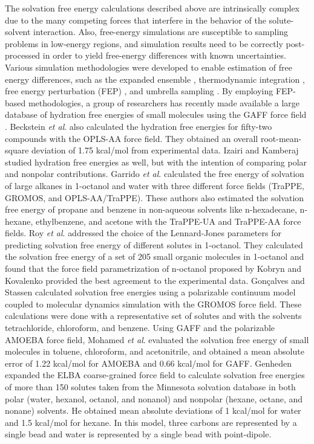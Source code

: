 \documentclass[preprint]{elsarticle}
\begin{document}
	The solvation free energy calculations described above are intrinsically complex due to the many competing forces that interfere in the behavior of the solute-solvent interaction. Also, free-energy simulations are susceptible to sampling problems in low-energy regions, and simulation results need to be correctly post-processed in order to yield free-energy differences with known uncertainties. Various simulation methodologies were developed to enable estimation of free energy differences, such as the expanded ensemble \cite{lyubartsev}, thermodynamic integration \cite{kirkwood1935}, free energy perturbation (FEP) \cite{zwanzig1954,bennet1976,mbar}, and umbrella sampling \cite{TORRIE1977187}. By employing FEP-based methodologies, a group of researchers has recently made available a large database of hydration free energies of small molecules using the GAFF force field \cite{PMID:24928188,mobley2017}. Beckstein \textit{et al}. \cite{Beckstein2014} also calculated the hydration free energies for fifty-two compounds with the OPLS-AA force field. They obtained an overall root-mean-square deviation of 1.75 kcal/mol from experimental data. Izairi and Kamberaj \cite{izairi2017} studied hydration free energies as well, but with the intention of comparing polar and nonpolar contributions. Garrido \textit{et al}. \cite{garrido,garrido2011} calculated the free energy of solvation of large alkanes in 1-octanol and water with three different force fields (TraPPE, GROMOS, and OPLS-AA/TraPPE). These authors also estimated the solvation free energy of propane and benzene in non-aqueous solvents like n-hexadecane, n-hexane, ethylbenzene, and acetone with the TraPPE-UA and TraPPE-AA force fields. Roy \textit{et al}. \cite{roy2017} addressed the choice of the Lennard-Jones parameters for predicting solvation free energy of different solutes in 1-octanol. They calculated the solvation free energy of a set of 205 small organic molecules in 1-octanol and found that the force field parametrization of n-octanol proposed by Kobryn and Kovalenko \cite{doi:10.1063/1.2972978} provided the best agreement to the experimental data. Gon\c{c}alves and Stassen \cite{goncalves} calculated solvation free energies using a polarizable continuum model coupled to molecular dynamics simulation with the GROMOS force field. These calculations were done with a representative set of solutes and with the solvents tetrachloride, chloroform, and benzene. Using GAFF and the polarizable AMOEBA \cite{doi:10.1021/ja037005r} force field, Mohamed \textit{et al}. \cite{mohamed2016} evaluated the solvation free energy of small molecules in toluene, chloroform, and acetonitrile, and obtained a mean absolute error of 1.22 kcal/mol for AMOEBA and 0.66 kcal/mol for GAFF. Genheden \cite{doi:10.1021/acs.jctc.5b00963} expanded the ELBA coarse-grained force field \cite{10.1371/journal.pone.0028637} to calculate solvation free energies of more than 150 solutes taken from the Minnesota solvation database \cite{Minnesota} in both polar (water, hexanol, octanol, and nonanol) and nonpolar (hexane, octane, and nonane) solvents. He obtained mean absolute deviations of 1 kcal/mol for water and 1.5 kcal/mol for hexane. In this model, three carbons are represented by a single bead and water is represented by a single bead with point-dipole.
	
\end{document}
